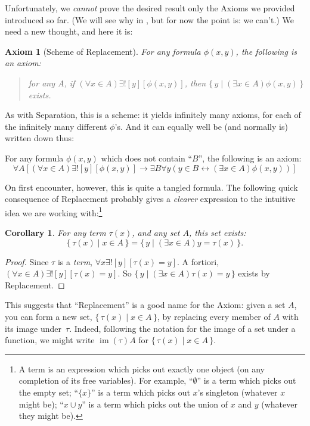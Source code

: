 \documentclass[10pt,a4paper]{article}
\makeatletter
\theoremstyle{plain}
\newtheorem{cor}[thm]{Corollary}
\newtheorem{axiom}{Axiom}
\theoremstyle{definition}
\theoremstyle{remark}
\newcommand{\olref}{\@ifnextchar[{\olref@i}{\olref@final}}
\def\olref@i[#1]{\@ifnextchar[{\olref@ii}{\olref@final}}
\def\olref@ii[#1]{\@ifnextchar[{\olref@iii}{\olref@final}}
\def\olref@iii[#1]{\olref@final}
\def\olref@final#1{\ref{#1}}
\providecommand{\lif}{\mathbin{\rightarrow}}
\providecommand{\lexists}{\mathord{\exists}}
\providecommand{\funimage}[1]{\operatorname{im}(#1)}
\providecommand{\Setabs}[2]{\{\, #1 \mid #2 \,\}}
\providecommand{\liff}{\mathbin{\leftrightarrow}}
\makeatother
\begin{document}
Unfortunately, we \emph{cannot} prove the desired result only the
Axioms we provided introduced so far. (We will see why in
\olref[replacement][strength]{sec}, but for now the point is: we can't.) We need a
new thought, and here it is:

\begin{axiom}[Scheme of Replacement]
For any formula $\phi(x, y)$, the following is an axiom:
\begin{quote}
	for any $A$, if $(\forall x \in A)\lexists![y][\phi(x,y)]$, then
	$\Setabs{y}{(\exists x \in A)\phi(x,y)}$ exists.
\end{quote}
\end{axiom}
\noindent
As with Separation, this is a scheme: it yields infinitely many
axioms, for each of the infinitely many different $\phi$'s. And it can
equally well be (and normally is) written down thus:

\begin{defish}
For any formula $\phi(x,y)$ which does not contain ``$B$'', the following is an axiom:
\[
\forall A[(\forall x \in A)\lexists![y][\phi(x,y)] \lif \exists B\forall y (y \in B \liff (\exists x \in A)\phi(x,y))]
\]
\end{defish}

On first encounter, however, this is quite a tangled formula. The
following quick consequence of Replacement probably gives a
\emph{clearer} expression to the intuitive idea we are working with:\footnote{A term is an expression which picks out exactly one object (on any completion of its free variables). For example, ``$\emptyset$'' is a term which picks out the empty set; ``$\{x\}$'' is a term which picks out $x$'s singleton (whatever $x$ might be); ``$x \cup y$'' is a term which picks out the union of $x$ and $y$ (whatever they might be).}

\begin{cor}
For any term $\tau(x)$, and any set $A$, this set exists:
\[
	\Setabs{\tau(x)}{x \in A} = \Setabs{y}{(\exists x \in A)y = \tau(x)}.
\]
\end{cor}

\begin{proof}
Since $\tau$ is a \emph{term}, $\forall x \lexists![y][\tau(x) = y]$.
A fortiori, $(\forall x \in A)\lexists![y][\tau(x) = y]$. So
$\Setabs{y}{(\exists x \in A)\tau(x) = y}$ exists by Replacement.
\end{proof}
\noindent
This suggests that ``Replacement'' is a good name for the Axiom: given
a set $A$, you can form a new set, $\Setabs{\tau(x)}{x \in A}$, by
replacing every member of $A$ with its image under~$\tau$. Indeed,
following the notation for the image of a set under a function, we
might write $\funimage{\tau}{A}$ for $\Setabs{\tau(x)}{x \in A}$.
\end{document}
